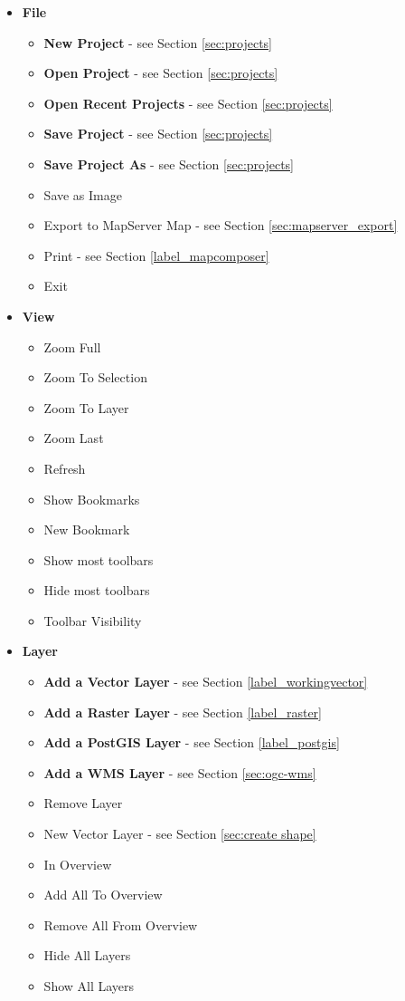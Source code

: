 \begin{itemize}

\item \textbf{File}
\begin{itemize}
\item \textbf{New Project}          - see Section \ref{sec:projects}
\item \textbf{Open Project}         - see Section \ref{sec:projects}
\item \textbf{Open Recent Projects} - see Section \ref{sec:projects}
\item \textbf{Save Project}         - see Section \ref{sec:projects}
\item \textbf{Save Project As}      - see Section \ref{sec:projects}
\item Save as Image
\item Export to MapServer Map       - see Section \ref{sec:mapserver_export}
\item Print                         - see Section \ref{label_mapcomposer}
\item Exit
\end{itemize}

\item \textbf{View}
\begin{itemize}
\item Zoom Full
\item Zoom To Selection
\item Zoom To Layer
\item Zoom Last
\item Refresh
\item Show Bookmarks
\item New Bookmark
\item Show most toolbars
\item Hide most toolbars 
\item Toolbar Visibility 
\end{itemize}

\item \textbf{Layer}
\begin{itemize}
\item \textbf{Add a Vector Layer}       - see Section \ref{label_workingvector}
\item \textbf{Add a Raster Layer}       - see Section \ref{label_raster}
\item \textbf{Add a PostGIS Layer}      - see Section \ref{label_postgis}
\item \textbf{Add a WMS Layer}          - see Section \ref{sec:ogc-wms}
\item Remove Layer
\item New Vector Layer          	- see Section \ref{sec:create shape}
\item In Overview
\item Add All To Overview
\item Remove All From Overview
\item Hide All Layers
\item Show All Layers
\end{itemize}


\end{itemize}
